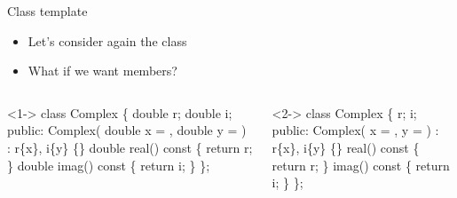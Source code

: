 \begin{frame}[fragile]{Class template}

  \begin{itemize}
  \item<1-> Let's consider again the  class
  \item<2-> What if we want  members?
  \end{itemize}

  \begin{columns}[t]

  \begin{column}{.5\textwidth}
    \begin{codeblock}<1->{
class Complex \{
  \alert{double} r;
  \alert{double} i;
 public:
  Complex(
      \alert{double} x = \alt<-2>{0.}{\alert<3->{double}\{\}}
    , \alert{double} y = 
  ) : r\{x\}, i\{y\} \{\}
  \alert{double} real() const \{ return r; \}
  \alert{double} imag() const \{ return i; \}
\};}\end{codeblock}

  \end{column}
  \begin{column}{.5\textwidth}
    \begin{codeblock}<2->{
class Complex \{
  \alt<-3>{\alert{float}}{\alert{FP}   } r;
   i;
 public:
  Complex(
      \alt<-3>{\alert{float}}{\alert{FP}   } x = 
    , \alt<-3>{\alert{float}}{\alert{FP}   } y = 
  ) : r\{x\}, i\{y\} \{\}
   real() const \{ return r; \}
   imag() const \{ return i; \}
\};}\end{codeblock}


  \end{column}

  \end{columns}


\end{frame}

